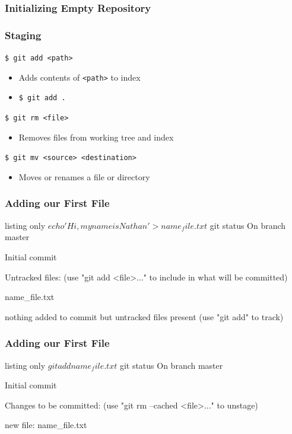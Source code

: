 \documentclass[english,compress]{beamer}
\begin{document}
\begin{frame}[fragile]
    \frametitle{Initializing Empty Repository}
\end{frame}

\begin{frame}[fragile]
    \frametitle{Staging}
    \verb|$ git add <path>|
    \begin{itemize}
        \item Adds contents of \verb|<path>| to index
        \item \verb|$ git add .|
    \end{itemize}

    \verb|$ git rm <file>|
    \begin{itemize}
        \item Removes files from working tree and index
    \end{itemize}

    \verb|$ git mv <source> <destination>|
    \begin{itemize}
        \item Moves or renames a file or directory
    \end{itemize}
\end{frame}

\begin{frame}[fragile]
    \frametitle{Adding our First File}
    \begin{tcblisting}{listing only}
$ echo 'Hi, my name is Nathan' > name_file.txt
$ git status
On branch master

Initial commit

Untracked files:
  (use "git add <file>..." to include in what will be committed)

	name_file.txt

nothing added to commit but untracked files present (use "git add" to track)
    \end{tcblisting}
\end{frame}

\begin{frame}[fragile]
    \frametitle{Adding our First File}
    \begin{tcblisting}{listing only}
$ git add name_file.txt
$ git status
On branch master

Initial commit

Changes to be committed:
  (use "git rm --cached <file>..." to unstage)

	new file:   name_file.txt
    \end{tcblisting}
\end{frame}
\end{document}
